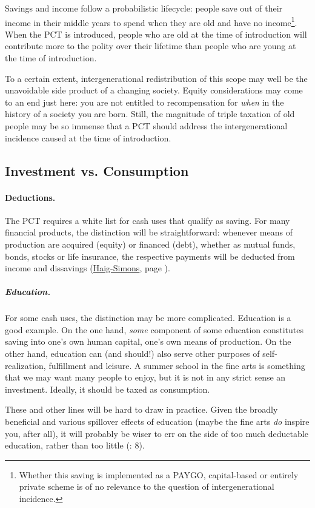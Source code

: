 Savings and income follow a probabilistic lifecycle: people save out of their income in their middle years to spend when they are old and have no income\footnote{
	Whether this saving is implemented as a PAYGO, capital-based or entirely private scheme is of no relevance to the question of intergenerational incidence.}. When the PCT is introduced, people who are old at the time of introduction will contribute more to the polity over their lifetime than people who are young at the time of introduction.

To a certain extent, intergenerational redistribution of this scope may well be the unavoidable side product of a changing society. Equity considerations may come to an end just here: you are not entitled to recompensation for \emph{when} in the history of a society you are born. Still, the magnitude of triple taxation of old people may be so immense that a PCT should address the intergenerational incidence caused at the time of introduction.

\subsection{Investment vs. Consumption}
\paragraph{Deductions.} The PCT requires a white list for cash uses that qualify as saving. For many financial products, the distinction will be straightforward: whenever means of production are acquired (equity) or financed (debt), whether as mutual funds, bonds, stocks or life insurance, the respective payments will be deducted from income and dissavings (\hyperref[eq:HaigSimonsPCT]{Haig-Simons}, page \pageref{eq:HaigSimonsPCT}). 

\subparagraph{Education.} For some cash uses, the distinction may be more complicated. Education is a good example. On the one hand, \emph{some} component of some education constitutes saving into one's own human capital, one's own means of production. On the other hand, education can (and should!) also serve other purposes of self-realization, fulfillment and leisure. A summer school in the fine arts is something that we may want many people to enjoy, but it is not in any strict sense an investment. Ideally, it should be taxed as consumption. 

These and other lines will be hard to draw in practice. Given the broadly beneficial and various spillover effects of education (maybe the fine arts \emph{do} inspire you, after all), it will probably be wiser to err on the side of too much deductable education, rather than too little (\citealt{Seidman1997}: 8).

